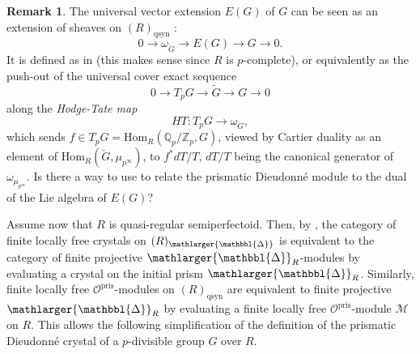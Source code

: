 \documentclass{amsart}
\newcommand{\prism}{{\mathlarger{\mathbbl{\Delta}}}}
\theoremstyle{plain}
\newtheorem{lemma}[theorem]{Lemma}
\theoremstyle{definition}
\newtheorem{remark}[theorem]{Remark}
\newcommand{\Fil}{\mathrm{Fil}}
\newcommand{\pris}{\mathrm{pris}}
\newcommand{\Q}{\mathbb{Q}}
\newcommand{\red}[1]{{\color{black} #1}}
\begin{document}

\begin{remark}
The universal vector extension $E(G)$ of $G$ can be seen as an extension of sheaves on $(R)_{\mathrm{qsyn}}$  :
\[ 0 \to \omega_{\check{G}} \to E(G) \to G \to 0. \]
It is defined as in \cite{messing_the_crystals_associated_to_barsotti_tate_groups} (this makes sense since $R$ is $p$-complete), or equivalently as the push-out of the universal cover exact sequence 
\[  0\to T_pG\to \tilde{G}\to G\to 0 \]
along the \textit{Hodge-Tate map}
\[ HT : T_p G \to \omega_{\check{G}}, \]
 which sends $f \in T_p G = \mathrm{Hom}_R(\mathbb{Q}_p/\mathbb{Z}_p,G)$, viewed by Cartier duality as an element of \red{$\mathrm{Hom}_{R}(\check{G},\mu_{p^{\infty}})$}, to $f^* dT/T$, $dT/T$ being the canonical generator of $\omega_{\mu_{p^{\infty}}}$. Is there a way to use  to relate the prismatic Dieudonn\'e module to the dual of the Lie algebra of $E(G)$?
 \end{remark}

Assume now that $R$ is quasi-regular semiperfectoid. Then, by , the category of finite locally free crystals on $(R)_\prism$ is equivalent to the category of finite projective $\prism_R$-modules by evaluating a crystal on the initial prism $\prism_R$. Similarly, finite locally free $\mathcal{O}^\pris$-modules on $(R)_{\mathrm{qsyn}}$ are equivalent to finite projective $\prism_R$ by evaluating a finite locally free $\mathcal{O}^\pris$-module $\mathcal{M}$ on $R$.
This allows the following simplification of the definition of the prismatic Dieudonn\'e crystal of a $p$-divisible group $G$ over $R$.
\end{document}
